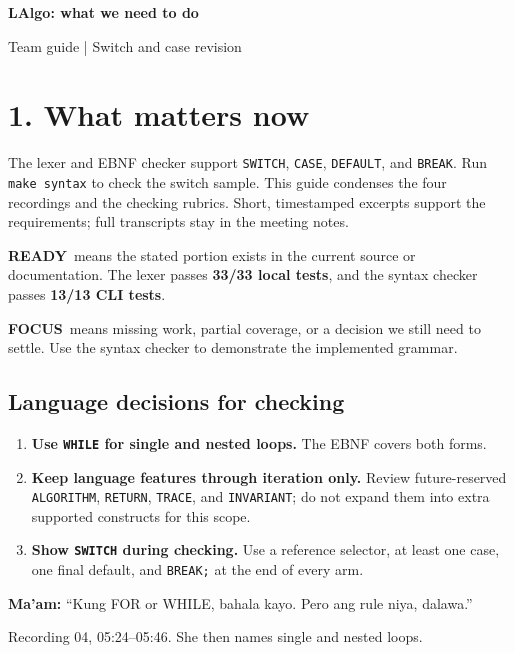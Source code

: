 \documentclass[11pt,a4paper]{article}
\newcommand{\code}[1]{\texttt{#1}}
\newcommand{\good}{\textcolor{ready}{\bfseries READY}}
\newcommand{\todo}{\textcolor{focus}{\bfseries FOCUS}}
\newcommand{\boxnote}[3]{\par\smallskip\begingroup\setlength{\fboxsep}{8pt}\colorbox{#1}{\parbox{\dimexpr\linewidth-2\fboxsep\relax}{\color{#2}\small #3}}\endgroup\par\smallskip}
\newcommand{\readybox}[1]{\boxnote{readybg}{ready}{#1}}
\newcommand{\focusbox}[1]{\boxnote{focusbg}{focus}{#1}}
\newcommand{\neutralbox}[1]{\boxnote{cream}{black}{#1}}
\newcommand{\profquote}[2]{\neutralbox{\textbf{Ma'am:} ``#1''\par{\footnotesize\color{muted}#2}}}
\begin{document}
{\fontsize{23}{28}\selectfont\bfseries\color{maroon}LAlgo: what we need to do\par}
{\small\color{muted}Team guide | Switch and case revision\par}
\vspace{2mm}

\section{1. What matters now}
The lexer and EBNF checker support \code{SWITCH}, \code{CASE}, \code{DEFAULT}, and \code{BREAK}. Run \code{make syntax} to check the switch sample.
This guide condenses the four recordings and the checking rubrics. Short,
timestamped excerpts support the requirements; full transcripts stay in the meeting notes.

\readybox{\good\ means the stated portion exists in the current source or documentation.
The lexer passes \textbf{33/33 local tests}, and the syntax checker passes \textbf{13/13 CLI tests}.}
\focusbox{\todo\ means missing work, partial coverage, or a decision we still need to settle.
Use the syntax checker to demonstrate the implemented grammar.}

\subsection{Language decisions for checking}
\begin{enumerate}
\item \textbf{Use \code{WHILE} for single and nested loops.} The EBNF covers both forms.
\item \textcolor{focus}{\textbf{Keep language features through iteration only.}}
Review future-reserved \code{ALGORITHM}, \code{RETURN}, \code{TRACE}, and \code{INVARIANT};
do not expand them into extra supported constructs for this scope.
\item \textbf{Show \code{SWITCH} during checking.} Use a reference selector, at least one case, one final default, and \code{BREAK;} at the end of every arm.
\end{enumerate}

\profquote{Kung FOR or WHILE, bahala kayo. Pero ang rule niya, dalawa.}{Recording 04, 05:24--05:46. She then names single and nested loops.}
\end{document}
